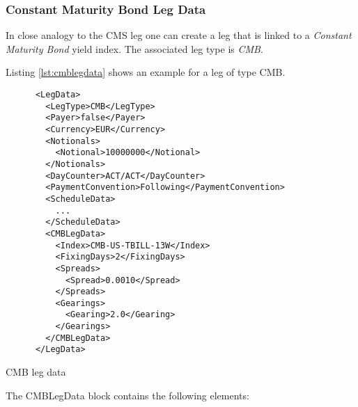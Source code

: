\subsubsection{Constant Maturity Bond Leg Data}
\label{ss:cmblegdata}

In close analogy to the CMS leg one can create a leg that is linked to a
{\em Constant Maturity Bond} yield index. The associated leg type is {\em CMB}.  

Listing \ref{lst:cmblegdata} shows an example for a leg of type CMB. 

\begin{listing}[H]
\begin{verbatim}
      <LegData>
        <LegType>CMB</LegType>
        <Payer>false</Payer>
        <Currency>EUR</Currency>
        <Notionals>
          <Notional>10000000</Notional>
        </Notionals>
        <DayCounter>ACT/ACT</DayCounter>
        <PaymentConvention>Following</PaymentConvention>
        <ScheduleData>
          ...
        </ScheduleData>
        <CMBLegData>
          <Index>CMB-US-TBILL-13W</Index>
          <FixingDays>2</FixingDays>
          <Spreads>
            <Spread>0.0010</Spread>
          </Spreads>
          <Gearings>
            <Gearing>2.0</Gearing>
          </Gearings>
        </CMBLegData>
      </LegData>
\end{verbatim}
\caption{CMB leg data}
\label{lst:cmblegdata}
\end{listing}

The CMBLegData block contains the following elements:

